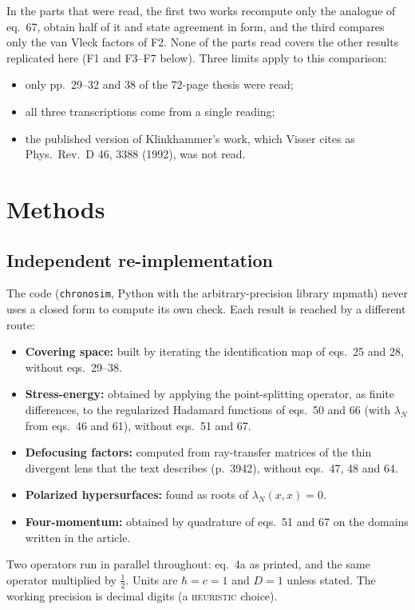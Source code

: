 In the parts that were read, the first two works recompute only the analogue of eq.~67, obtain half of it and state agreement in form, and the third compares only the van Vleck factors of F2. None of the parts read covers the other results replicated here (F1 and F3--F7 below). Three limits apply to this comparison:
\begin{itemize}
\item only pp.~29--32 and 38 of the 72-page thesis were read;
\item all three transcriptions come from a single reading;
\item the published version of Klinkhammer's work, which Visser cites as Phys.\ Rev.\ D 46, 3388 (1992), was not read.
\end{itemize}

\section{Methods}

\subsection{Independent re-implementation}

The code (\texttt{chronosim}, Python with the arbitrary-precision library mpmath) never uses a closed form to compute its own check. Each result is reached by a different route:
\begin{itemize}
\item \textbf{Covering space:} built by iterating the identification map of eqs.~25 and 28, without eqs.~29--38.
\item \textbf{Stress-energy:} obtained by applying the point-splitting operator, as finite differences, to the regularized Hadamard functions of eqs.~50 and 66 (with $\lambda_N$ from eqs.~46 and 61), without eqs.~51 and 67.
\item \textbf{Defocusing factors:} computed from ray-transfer matrices of the thin divergent lens that the text describes (p.~3942), without eqs.~47, 48 and 64.
\item \textbf{Polarized hypersurfaces:} found as roots of $\lambda_N(x,x) = 0$.
\item \textbf{Four-momentum:} obtained by quadrature of eqs.~51 and 67 on the domains written in the article.
\end{itemize}
Two operators run in parallel throughout: eq.~4a as printed, and the same operator multiplied by $\tfrac12$. Units are $\hbar = c = 1$ and $D = 1$ unless stated. The working precision is \WorkingDigits{} decimal digits (a \textsc{heuristic} choice).

